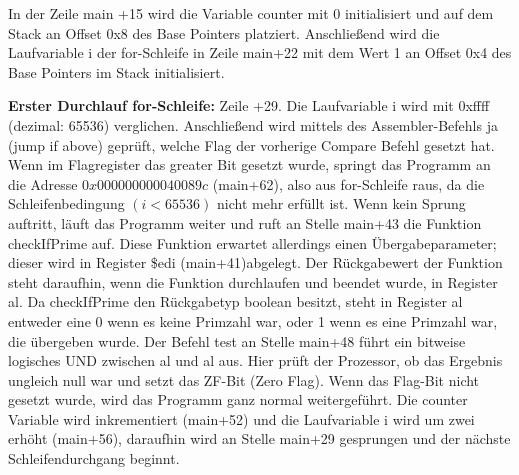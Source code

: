 \documentclass[12pt]{article}
\begin{document}
\noindent In der Zeile main +15 wird die Variable counter mit 0 initialisiert und auf dem Stack an Offset 0x8 des Base Pointers platziert. 
Anschließend wird die Laufvariable i der for-Schleife in Zeile main+22 mit dem Wert 1 an Offset 0x4 des Base Pointers im Stack initialisiert.
\par\smallskip\noindent\textbf{Erster Durchlauf for-Schleife: } Zeile +29. Die Laufvariable i wird mit 0xffff (dezimal: 65536) verglichen. Anschließend wird mittels des Assembler-Befehls ja (jump if above) geprüft, welche Flag der vorherige Compare Befehl gesetzt hat. Wenn im Flagregister das greater Bit gesetzt wurde, springt das Programm an die Adresse $0x000000000040089c$ (main+62), also aus for-Schleife raus, da die Schleifenbedingung $(i<65536)$ nicht mehr erfüllt ist. Wenn kein Sprung auftritt, läuft das Programm weiter und ruft an Stelle main+43 die Funktion checkIfPrime auf. Diese Funktion erwartet allerdings einen Übergabeparameter; dieser wird in Register \$edi (main+41)abgelegt. 
Der Rückgabewert der Funktion steht daraufhin, wenn die Funktion durchlaufen und beendet wurde, in Register al. Da checkIfPrime den Rückgabetyp boolean besitzt, steht in Register al entweder eine 0 wenn es keine Primzahl war, oder 1 wenn es eine Primzahl war, die übergeben wurde. Der Befehl test an Stelle main+48 führt ein bitweise logisches UND zwischen al und al aus. Hier prüft der Prozessor, ob das Ergebnis ungleich null war und setzt das ZF-Bit (Zero Flag). Wenn das Flag-Bit nicht gesetzt wurde, wird das Programm ganz normal weitergeführt. Die counter Variable wird inkrementiert (main+52) und die Laufvariable i wird um zwei erhöht (main+56), daraufhin wird an Stelle main+29 gesprungen und der nächste Schleifendurchgang beginnt.
\end{document}
